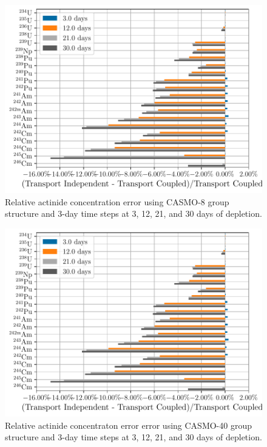     \begin{figure}[h!tpb]
        \centering
        \includegraphics[width=\linewidth]{figs/actinides_casmo8_constant_xs_predictor_fission_q_days.pdf}
        \caption[]{Relative actinide concentration error using
        CASMO-8 group structure and 3-day time steps at 3, 12, 21, and 30 days
    of depletion.}
        \label{fig:actinides-error-casmo8-xs-days}
    \end{figure}

    \begin{figure}[h!tpb]
        \centering
        \includegraphics[width=\linewidth]{figs/actinides_casmo40_constant_xs_predictor_fission_q_days.pdf}
        \caption{Relative actinide concentraton error error using
        CASMO-40 group structure and 3-day time steps at 3, 12, 21, and 30 days
    of depletion.}
        \label{fig:actinides-error-casmo40-xs-days}
    \end{figure}


